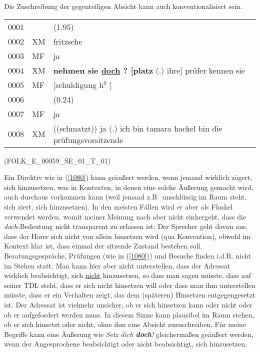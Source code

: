 Die Zuschreibung der gegenteiligen Absicht kann auch konventionalisiert sein. 
	
\begin{exe}
	\ex\label{1080} 

    \begin{tabularx}{\linewidth}[t]{@{}llX@{}}
	0001 & & (1.95)\\
	0002 &	XM & fritzsche\\
	0003 & MF & ja\\
	0004 & XM &	\textbf{nehmen sie \ul{doch} ? [platz} (.) ihre] prüfer kennen sie\\
	0005 & MF &	[schuldigung h$^{0}$ ]\\
	0006 & & (0.24)\\
	0007 & MF & ja\\
	0008 & XM & ((schmatzt)) ja (.) ich bin tamara hackel bin die prüfungsvorsitzende
	\end{tabularx}
	\newline
	\hbox{}\hfill\hbox{(\scshape FOLK\_E\_00059\_SE\_01\_T\_01)} 					        
\end{exe}
Ein Direktiv wie in (\ref{1080}) kann geäußert werden, wenn jemand wirklich zögert, sich hinzusetzen, was in Kontexten, in denen eine solche Äußerung gemacht wird, auch durchaus vorkommen kann (weil jemand z.B.\ unschlüssig im Raum steht, sich ziert, sich hinzusetzen). In den meisten Fällen wird er aber als Floskel verwendet werden, womit meiner Meinung nach aber nicht einhergeht, dass die \textit{doch}-Bedeutung nicht transparent zu erfassen ist: Der Sprecher geht davon aus, dass der Hörer sich nicht von allein hinsetzen wird (qua Konvention), obwohl im Kontext klar ist, dass einmal der sitzende Zustand bestehen soll. Beratungsgespräche, Prüfungen (wie in (\ref{1080})) und Besuche finden i.d.R. nicht im Stehen statt. Man kann hier aber nicht unterstellen, dass der Adressat wirklich beabsichtigt, sich \ul{nicht} hinzusetzen, so dass man sagen müsste, dass auf seiner TDL steht, dass er sich nicht hinsetzen will oder dass man ihm unterstellen müsste, dass er ein Verhalten zeigt, das dem (späteren) Hinsetzen entgegengesetzt ist. Der Adressat ist vielmehr unsicher, ob er sich hinsetzen kann oder nicht oder ob er aufgefordert werden muss. In diesem Sinne kann plausibel im Raum stehen, ob er sich hinsetzt oder nicht, ohne ihm eine Absicht zuzuschreiben. Für meine Begriffe kann eine Äußerung wie \textit{Setz dich \textbf{doch}!} gleichermaßen geäußert werden, wenn der Angesprochene beabsichtigt oder nicht beabsichtigt, sich hinzusetzen.

